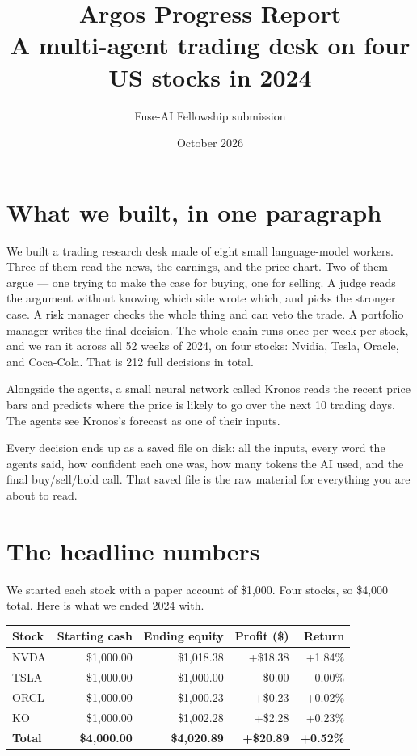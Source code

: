 \documentclass[11pt,a4paper]{article}
\title{\textbf{Argos Progress Report}\\
\large A multi-agent trading desk on four US stocks in 2024}
\author{Fuse-AI Fellowship submission}
\date{October 2026}
\begin{document}
\maketitle

\section{What we built, in one paragraph}

We built a trading research desk made of eight small language-model workers.
Three of them read the news, the earnings, and the price chart. Two of them
argue --- one trying to make the case for buying, one for selling. A judge
reads the argument without knowing which side wrote which, and picks the
stronger case. A risk manager checks the whole thing and can veto the trade.
A portfolio manager writes the final decision. The whole chain runs once per
week per stock, and we ran it across all 52 weeks of 2024, on four stocks:
Nvidia, Tesla, Oracle, and Coca-Cola. That is 212 full decisions in total.

Alongside the agents, a small neural network called Kronos reads the recent
price bars and predicts where the price is likely to go over the next 10
trading days. The agents see Kronos's forecast as one of their inputs.

Every decision ends up as a saved file on disk: all the inputs, every word
the agents said, how confident each one was, how many tokens the AI used,
and the final buy/sell/hold call. That saved file is the raw material for
everything you are about to read.

\section{The headline numbers}

We started each stock with a paper account of \$1{,}000. Four stocks, so
\$4{,}000 total. Here is what we ended 2024 with.

\begin{center}
\begin{tabular}{lrrrr}
\toprule
Stock & Starting cash & Ending equity & Profit (\$) & Return \\
\midrule
NVDA & \$1{,}000.00 & \$1{,}018.38 & \textcolor{black!70!green}{+\$18.38} & +1.84\% \\
TSLA & \$1{,}000.00 & \$1{,}000.00 & \$0.00 & 0.00\% \\
ORCL & \$1{,}000.00 & \$1{,}000.23 & +\$0.23 & +0.02\% \\
KO   & \$1{,}000.00 & \$1{,}002.28 & +\$2.28 & +0.23\% \\
\midrule
\textbf{Total} & \textbf{\$4{,}000.00} & \textbf{\$4{,}020.89} & \textcolor{black!70!green}{\textbf{+\$20.89}} & \textbf{+0.52\%} \\
\bottomrule
\end{tabular}
\end{center}
\end{document}
